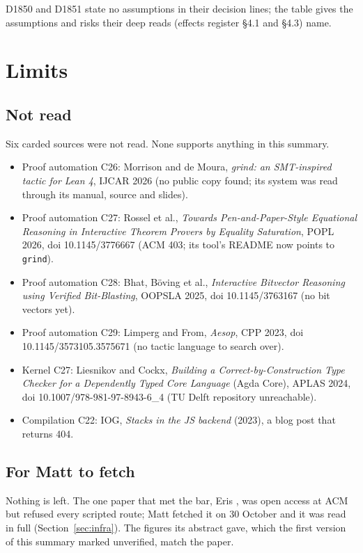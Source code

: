 \documentclass[11pt,a4paper]{article}
\newcommand{\code}[1]{\texttt{#1}}
\begin{document}
D1850 and D1851 state no assumptions in their decision lines; the table gives the assumptions
and risks their deep reads (effects register \S4.1 and \S4.3) name.

\section{Limits}\label{sec:limits}

\subsection{Not read}
Six carded sources were not read. None supports anything in this summary.
\begin{itemize}
  \item Proof automation C26: Morrison and de Moura, \emph{grind: an SMT-inspired tactic for Lean
        4}, I{}JCAR 2026 (no public copy found; its system was read through its manual, source and
        slides).
  \item Proof automation C27: Rossel et al., \emph{Towards Pen-and-Paper-Style Equational
        Reasoning in Interactive Theorem Provers by Equality Saturation}, POPL 2026, doi
        10.1145/3776667 (ACM 403; its tool's README now points to \code{grind}).
  \item Proof automation C28: Bhat, B\"oving et al., \emph{Interactive Bitvector Reasoning using
        Verified Bit-Blasting}, OOPSLA 2025, doi 10.1145/3763167 (no bit vectors yet).
  \item Proof automation C29: Limperg and From, \emph{Aesop}, CPP 2023, doi
        10.1145/3573105.3575671 (no tactic language to search over).
  \item Kernel C27: Liesnikov and Cockx, \emph{Building a Correct-by-Construction Type Checker
        for a Dependently Typed Core Language} (Agda Core), APLAS 2024, doi
        10.1007/978-981-97-8943-6\_4 (TU Delft repository unreachable).
  \item Compilation C22: IOG, \emph{Stacks in the JS backend} (2023), a blog post that returns
        404.
\end{itemize}

\subsection{For Matt to fetch}
Nothing is left. The one paper that met the bar, Eris \cite{sotiropoulos2026eris}, was open
access at ACM but refused every scripted route; Matt fetched it on 30 October and it was read in
full (Section~\ref{sec:infra}). The figures its abstract gave, which the first version of this
summary marked unverified, match the paper.
\end{document}

